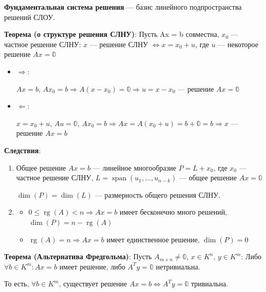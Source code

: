 \documentclass[twoside]{book}
\DeclareMathOperator{\rg}{rg}
\DeclareMathOperator{\spann}{span}
\begin{document}
\textbf{Фундаментальная система решения} --- базис линейного подпространства решений СЛОУ.

\textbf{Теорема (о структуре решения СЛНУ)}: Пусть Ax = b совместна, \(x_0\) --- частное решение СЛНУ: \(x\) --- решение СЛНУ \(\Leftrightarrow x = x_0 + u\), где \(u\) --- некоторое решение \(Ax = \mathbb{0}\)
\begin{itemize}
    \item \(\Rightarrow\):

          \(Ax = b\), \(Ax_0 = b \Rightarrow A(x - x_0) = \mathbb{0} \Rightarrow u = x - x_0\) --- решение \(Ax = \mathbb{0}\)

    \item \(\Leftarrow\):

          \(x = x_0 + u\), \(Au = \mathbb{0}\), \(Ax_0 = b \Rightarrow Ax = A(x_0 + u) = b + \mathbb{0} = b \Rightarrow x\) --- решение \(Ax = b\)
\end{itemize}
\textbf{Следствия}:
\begin{enumerate}
    \item Общее решение \(Ax = b\) --- линейное многообразие \(P = L + x_0\), где \(x_0\) --- частное решение СЛНУ, \(L = \spann(u_1, \ldots, u_{n-k})\) --- общее решение \(Ax = \mathbb{0}\)

          \(\dim(P) = \dim(L)\) --- размерность общего решения СЛНУ.

    \item
          \begin{itemize}
              \item \(0 \leq \rg(A) < n \Rightarrow Ax = b\) имеет бесконечно много решений, \(\dim(P) = n - \rg(A)\)

              \item \(\rg(A) = n \Rightarrow Ax = b\) имеет единственное решение, \(\dim(P) = 0\)
          \end{itemize}
\end{enumerate}

\textbf{Теорема (Альтернатива Фредгольма)}: Пусть \(A_{m\times n} \neq \mathbb{0}\), \(x \in K^n\), \(y \in K^m\): Либо \(\forall b \in K^m: Ax = b\) имеет решение, либо \(A^Ty = \mathbb{0}\) нетривиальна.

То есть, \(\forall b \in K^m\), существует решение \(Ax = b \Leftrightarrow A^Ty = \mathbb{0}\) тривиальна.
\end{document}
